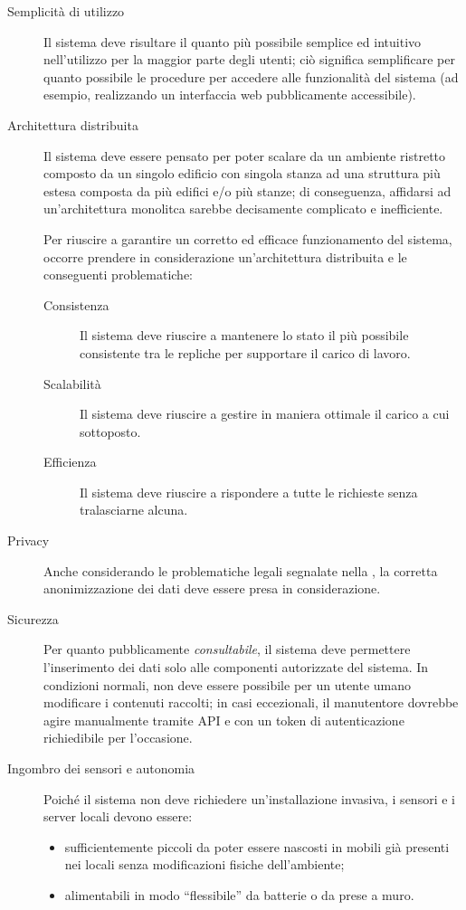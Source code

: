 \begin{description}
  \item[Semplicità di utilizzo]
    Il sistema deve risultare il quanto più possibile semplice ed intuitivo nell'utilizzo per la maggior parte degli utenti;
    ciò significa semplificare per quanto possibile le procedure per accedere alle funzionalità del sistema (ad esempio, realizzando un interfaccia web pubblicamente accessibile).
  \item[Architettura distribuita]
    Il sistema deve essere pensato per poter scalare da un ambiente ristretto composto da un singolo edificio con singola stanza ad una struttura più estesa composta da più edifici e/o più stanze;
    di conseguenza, affidarsi ad un'architettura monolitca sarebbe decisamente complicato e inefficiente.

    Per riuscire a garantire un corretto ed efficace funzionamento del sistema, occorre prendere in considerazione un'architettura distribuita e le conseguenti problematiche:

    \begin{description}
      \item[Consistenza]
        Il sistema deve riuscire a mantenere lo stato il più possibile consistente tra le repliche per supportare il carico di lavoro.
      \item[Scalabilità]
        Il sistema deve riuscire a gestire in maniera ottimale il carico a cui sottoposto.
      \item[Efficienza]
        Il sistema deve riuscire a rispondere a tutte le richieste senza tralasciarne alcuna.
    \end{description}
  \item[Privacy]
    Anche considerando le problematiche legali segnalate nella , la corretta anonimizzazione dei dati deve essere presa in considerazione.
  \item[Sicurezza]
    Per quanto pubblicamente \emph{consultabile}, il sistema deve permettere l'inserimento dei dati solo alle componenti autorizzate del sistema.
    In condizioni normali, non deve essere possibile per un utente umano modificare i contenuti raccolti;
    in casi eccezionali, il manutentore dovrebbe agire manualmente tramite API e con un token di autenticazione richiedibile per l'occasione.
  \item[Ingombro dei sensori e autonomia]
    Poiché il sistema non deve richiedere un'installazione invasiva, i sensori e i server locali devono essere:
    \begin{itemize}
      \item sufficientemente piccoli da poter essere nascosti in mobili già presenti nei locali senza modificazioni fisiche dell'ambiente;
      \item alimentabili in modo ``flessibile'' da batterie o da prese a muro.
    \end{itemize}
\end{description}
